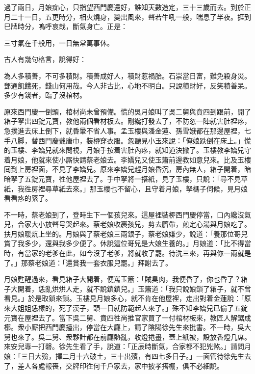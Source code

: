 過了兩日，月娘痴心，只指望西門慶還好，誰知天數造定，三十三歲而去。到於正月二十一日，五更時分，相火燒身，變出風來，聲若牛吼一般，喘息了半夜。捱到巳牌時分，嗚呼哀哉，斷氣身亡。正是：

三寸氣在千般用，一日無常萬事休。{}

古人有幾句格言，說得好：

\begin{myquote} 
為人多積善，不可多積財。積善成好人，積財惹禍胎。石崇當日富，難免殺身災。鄧通飢餓死，錢山何用哉。今人非古比，心地不明白。只說積財好，反笑積善呆。多少有錢者，臨了沒棺材。
\end{myquote} 

原來西門慶一倒頭，棺材尚未曾預備。慌的吳月娘叫了吳二舅與賁四到跟前，開了箱子拏出四錠元寶，教他兩個看材板去。剛纔打發去了，不防忽一陣就害肚裡疼，急撲進去床上倒下，就昏暈不省人事。孟玉樓與潘金蓮、孫雪娥都在那邊屋裡，七手八脚，替西門慶戴唐巾，裝桺穿衣服。忽聽見小玉來說：「俺娘跌倒在床上。」慌的玉樓、李嬌兒就來問視，月娘手按着害肚內疼，就知道決撒了。玉樓教李嬌兒守着月娘，他就來使小厮快請蔡老娘去。李嬌兒又使玉簫前邊教如意兒來。比及玉樓囘到上房裡面，不見了李嬌兒。原來李嬌兒趕月娘昏沉，房內無人，箱子開着，暗暗拏了五錠元寶，徃他屋裡去了。手中拏將一搭紙，見了玉樓，只說：「尋不見草紙，我徃房裡尋草紙去來。」那玉樓也不留心，且守着月娘，拏榪子伺候，見月娘看看疼的緊了。

不一時，蔡老娘到了，登時生下一個孩兒來。這屋裡裝桺西門慶停當，口內纔沒氣兒，合家大小放聲号哭起來。蔡老娘收裹孩兒，剪去臍帶，煎定心湯與月娘吃了。扶月娘暖炕上坐的。月娘與了蔡老娘三兩銀子，蔡老娘嫌少，說道：「養那位哥兒賞了我多少，還與我多少便了。休說這位哥兒是大娘生養的。」月娘道：「比不得當時，有當家的老爹在此，如今沒了老爹，將就收了罷。待洗三來，再與你一兩就是了。」那蔡老娘道：「還賞我一套衣服兒罷。」拜謝去了。

月娘甦醒過來，看見箱子大開着，便罵玉簫：「賊臭肉，我便昏了，你也昏了？箱子大開着，恁亂烘烘人走，就不說鎖鎖兒。」玉簫道：「我只說娘鎖了箱子，就不曾看見。」於是取鎖來鎖。玉樓見月娘多心，就不肯在他屋裡，走出對着金蓮說：「原來大姐姐恁樣的，死了漢子，頭一日就防範起人來了。」殊不知李嬌兒已偷了五錠元寶在屋裡去了。當下吳二舅、賁四徃尚推官家買了一付棺材板來，教匠人解鋸成槨。衆小厮把西門慶擡出，停當在大廳上，請了陰陽徐先生來批書。不一時，吳大舅也來了。吳二舅、衆夥計都在前廳熱亂，收燈捲畫，蓋上紙被，設放香燈几席。來安兒專一打磬。徐先生看了手，說道：「正辰時斷氣，合家都不犯兇煞。」請問月娘：「三日大殮，擇二月十六破土，三十出殯，有四七多日子。」一面管待徐先生去了，差人各處報䘮，交牌印徃何千戶家去，家中披孝搭棚，俱不必細說。

